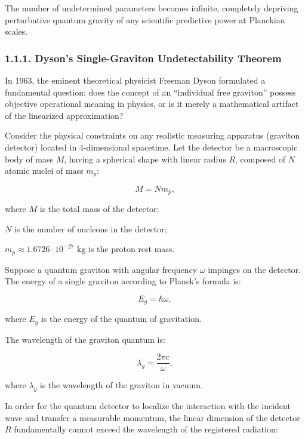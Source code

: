 \documentclass[11pt,a4paper]{article}
\theoremstyle{definition}
\begin{document}
The number of undetermined parameters becomes infinite, completely depriving perturbative quantum gravity of any scientific predictive power at Planckian scales.


\subsubsection{1.1.1. Dyson's Single-Graviton Undetectability Theorem \cite{ref4}}\label{sec:1.1.1}

In 1963, the eminent theoretical physicist Freeman Dyson formulated a fundamental question: does the concept of an ``individual free graviton'' possess objective operational meaning in physics, or is it merely a mathematical artifact of the linearized approximation?

Consider the physical constraints on any realistic measuring apparatus (graviton detector) located in 4-dimensional spacetime. Let the detector be a macroscopic body of mass $M$, having a spherical shape with linear radius $R$, composed of $N$ atomic nuclei of mass $m_p$:

\begin{equation}\label{eq:1.16}\tag{1.16}
M = N m_p,
\end{equation}

where $M$ is the total mass of the detector;  

$N$ is the number of nucleons in the detector;  

$m_p \approx 1.6726 \cdot 10^{-27}\text{ kg}$ is the proton rest mass.

Suppose a quantum graviton with angular frequency $\omega$ impinges on the detector. The energy of a single graviton according to Planck's formula is:

\begin{equation}\label{eq:1.17}\tag{1.17}
E_g = \hbar \omega,
\end{equation}

where $E_g$ is the energy of the quantum of gravitation.

The wavelength of the graviton quantum is:

\begin{equation}\label{eq:1.18}\tag{1.18}
\lambda_g = \frac{2\pi c}{\omega},
\end{equation}

where $\lambda_g$ is the wavelength of the graviton in vacuum.

In order for the quantum detector to localize the interaction with the incident wave and transfer a measurable momentum, the linear dimension of the detector $R$ fundamentally cannot exceed the wavelength of the registered radiation:
\end{document}
